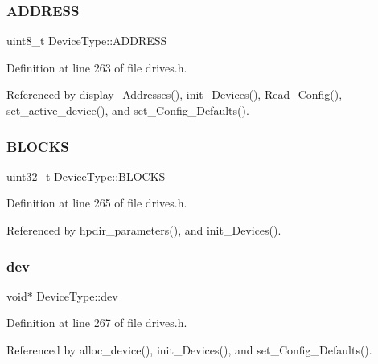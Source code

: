 \subsubsection{\texorpdfstring{A\+D\+D\+R\+E\+SS}{ADDRESS}}
{\footnotesize\ttfamily uint8\+\_\+t Device\+Type\+::\+A\+D\+D\+R\+E\+SS}



Definition at line 263 of file drives.\+h.



Referenced by display\+\_\+\+Addresses(), init\+\_\+\+Devices(), Read\+\_\+\+Config(), set\+\_\+active\+\_\+device(), and set\+\_\+\+Config\+\_\+\+Defaults().

\mbox{\label{structDeviceType_a29cbf84a3e9c8d01c8c77023ebf9c1f5}} 
\subsubsection{\texorpdfstring{B\+L\+O\+C\+KS}{BLOCKS}}
{\footnotesize\ttfamily uint32\+\_\+t Device\+Type\+::\+B\+L\+O\+C\+KS}



Definition at line 265 of file drives.\+h.



Referenced by hpdir\+\_\+parameters(), and init\+\_\+\+Devices().

\mbox{\label{structDeviceType_a59fc3b3cb45f8ee0cd1016bd64804d3b}} 
\subsubsection{\texorpdfstring{dev}{dev}}
{\footnotesize\ttfamily void$\ast$ Device\+Type\+::dev}



Definition at line 267 of file drives.\+h.



Referenced by alloc\+\_\+device(), init\+\_\+\+Devices(), and set\+\_\+\+Config\+\_\+\+Defaults().

\mbox{\label{structDeviceType_a47798e475b578d09f024fd983c69dfb6}} 

